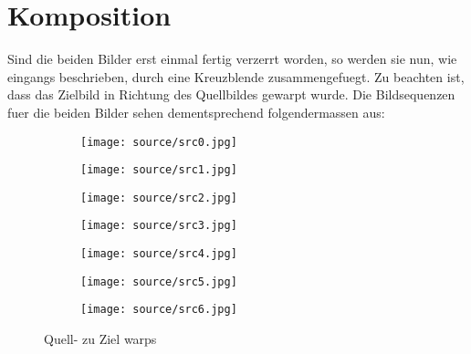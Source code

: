 \chapter{Komposition}

Sind die beiden Bilder erst einmal fertig verzerrt worden, so werden
sie nun, wie eingangs beschrieben, durch eine Kreuzblende 
zusammengefuegt. Zu beachten ist, dass das Zielbild
in Richtung des Quellbildes gewarpt wurde. Die Bildsequenzen
fuer die beiden Bilder sehen dementsprechend folgendermassen
aus:

\begin{figure}[htbp]
	\centering


	
	\begin{subfigure}[b]{0.19\textwidth}
		\centering
		\texttt{[image: source/src0.jpg]} %
		\caption{}
	\end{subfigure}
		\begin{subfigure}[b]{0.19\textwidth}
		\centering
		\texttt{[image: source/src1.jpg]} %
		\caption{}
	\end{subfigure}
		\begin{subfigure}[b]{0.19\textwidth}
		\centering
		\texttt{[image: source/src2.jpg]} %
		\caption{}
	\end{subfigure}
		\begin{subfigure}[b]{0.19\textwidth}
		\centering
		\texttt{[image: source/src3.jpg]} %
		\caption{}
	\end{subfigure}
		\begin{subfigure}[b]{0.19\textwidth}
		\centering
		\texttt{[image: source/src4.jpg]} %
		\caption{}
	\end{subfigure}
		\begin{subfigure}[b]{0.19\textwidth}
		\centering
		\texttt{[image: source/src5.jpg]} %
		\caption{}
	\end{subfigure}
			\begin{subfigure}[b]{0.19\textwidth}
		\centering
		\texttt{[image: source/src6.jpg]} %
		\caption{}
	\end{subfigure}
	

	
		\caption{Quell- zu Ziel warps}
	\label{fig:sources}
	\end{figure}
	
